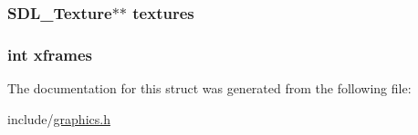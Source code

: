 \subsubsection[{\texorpdfstring{textures}{textures}}]{\setlength{\rightskip}{0pt plus 5cm}S\+D\+L\+\_\+\+Texture$\ast$$\ast$ textures}\hypertarget{structsprite__t_a15dffee77a6e5acc64cce7d08181fca1}{}\label{structsprite__t_a15dffee77a6e5acc64cce7d08181fca1}
\subsubsection[{\texorpdfstring{xframes}{xframes}}]{\setlength{\rightskip}{0pt plus 5cm}int xframes}\hypertarget{structsprite__t_a119f0bb9e23dbbf893c65aeb17e1c4ab}{}\label{structsprite__t_a119f0bb9e23dbbf893c65aeb17e1c4ab}


The documentation for this struct was generated from the following file\+:\begin{DoxyCompactItemize}
\item 
include/\hyperlink{graphics_8h}{graphics.\+h}\end{DoxyCompactItemize}

